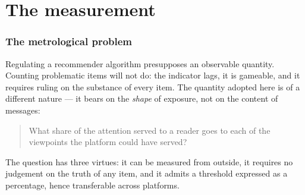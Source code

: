 \documentclass[11pt,a4paper]{article}
\begin{document}
\begin{abstract}
A fourth log, EB-NeRD, finally carries both expected columns --- the served list and a declared
section. The first check says its \textbf{recorded order does not contain the rank} ($z = +1.05$,
where the log would have detected a severity one hundred and thirty-four times smaller). The
rank-blind index is therefore measured for the first time on real feeds --- $0.50$ per user-day,
$5.1$ sections equally served out of $26$ --- and the exposed index only \emph{bounded}, to
within $0.104$: at a floor of $0.40$, a third of feeds breach it whatever their ordering, and six
in ten remain undecidable. What must be required of a log is therefore not the rank but the
\textbf{verifiable} rank --- and the exchangeability test is what verifies it. The catalogue,
finally, decides the level far more than the feed does: the same corpus scores $0.50$ over
twenty-six sections and $0.92$ over three, while the ordering between readers holds down to six
modalities and then collapses.

The index came from a thermodynamic model whose every own claim the audit refuted, and which no
longer appears here: the quantum decoherence analogy that started
this work survives none of its transfers. All code, tests and figures are reproducible in
containers.
\end{abstract}

\part{The measurement}
\label{part:measure}

\section{The metrological problem}
\label{sec:problem}

Regulating a recommender algorithm presupposes an observable quantity. Counting problematic
items will not do: the indicator lags, it is gameable, and it requires ruling on the substance
of every item. The quantity adopted here is of a different nature --- it bears on the
\emph{shape} of exposure, not on the content of messages:

\begin{quote}
What share of the attention served to a reader goes to each of the viewpoints the platform
could have served?
\end{quote}

The question has three virtues: it can be measured from outside, it requires no judgement on
the truth of any item, and it admits a threshold expressed as a percentage, hence transferable
across platforms.
\end{document}
